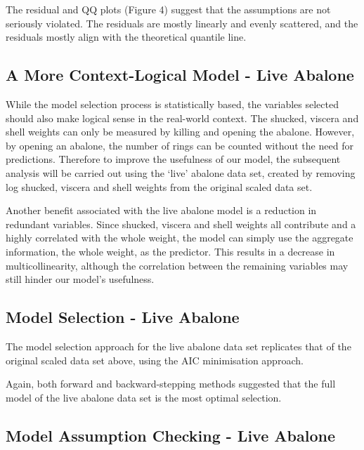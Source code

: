 \documentclass[a4paper,9pt,twocolumn,twoside,]{pinp}
\begin{document}
The residual and QQ plots (Figure 4) suggest that the assumptions are
not seriously violated. The residuals are mostly linearly and evenly
scattered, and the residuals mostly align with the theoretical quantile
line.

\hypertarget{a-more-context-logical-model---live-abalone}{%
\subsection{A More Context-Logical Model - Live
Abalone}\label{a-more-context-logical-model---live-abalone}}

While the model selection process is statistically based, the variables
selected should also make logical sense in the real-world context. The
shucked, viscera and shell weights can only be measured by killing and
opening the abalone. However, by opening an abalone, the number of rings
can be counted without the need for predictions. Therefore to improve
the usefulness of our model, the subsequent analysis will be carried out
using the `live' abalone data set, created by removing log shucked,
viscera and shell weights from the original scaled data set.

Another benefit associated with the live abalone model is a reduction in
redundant variables. Since shucked, viscera and shell weights all
contribute and a highly correlated with the whole weight, the model can
simply use the aggregate information, the whole weight, as the
predictor. This results in a decrease in multicollinearity, although the
correlation between the remaining variables may still hinder our model's
usefulness.

\newpage

\hypertarget{model-selection---live-abalone}{%
\subsection{Model Selection - Live
Abalone}\label{model-selection---live-abalone}}

The model selection approach for the live abalone data set replicates
that of the original scaled data set above, using the AIC minimisation
approach.

Again, both forward and backward-stepping methods suggested that the
full model of the live abalone data set is the most optimal selection.

\hypertarget{model-assumption-checking---live-abalone}{%
\subsection{Model Assumption Checking - Live
Abalone}\label{model-assumption-checking---live-abalone}}
\end{document}
